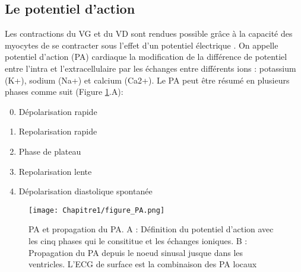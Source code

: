 \subsection{Le potentiel d'action}



Les contractions du VG et du VD sont rendues possible grâce à la capacité des myocytes de se contracter sous l’effet d’un potentiel électrique \cite{renard:tel-04344684}. On appelle potentiel d’action (PA) cardiaque la modification de la différence de potentiel entre l’intra et l’extracellulaire par les échanges entre différents ions : potassium (K+), sodium (Na+) et calcium (Ca2+). Le PA peut être résumé en plusieurs phases comme suit  (Figure \ref{fig:fig_PA}.A): 

\begin{enumerate}
\setcounter{enumi}{-1}
\item Dépolarisation rapide
\item Repolarisation rapide
\item Phase de plateau
\item Repolarisation lente
\item Dépolarisation diastolique spontanée
\end{enumerate}

\begin{figure}[!htbp]
  \begin{center}
    \texttt{[image: Chapitre1/figure\_PA.png]}
     \end{center}
    \caption{PA et propagation du PA. A : Définition du potentiel d'action avec les cinq phases qui le consititue et les échanges ioniques. B : Propagation du PA depuis le noeud sinusal jusque dans les ventricles. L'ECG de surface est la combinaison des PA locaux}
  \label{fig:fig_PA}
\end{figure}


